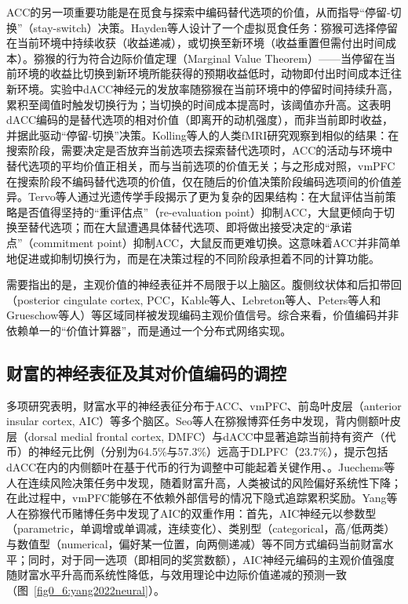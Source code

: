 ACC的另一项重要功能是在觅食与探索中编码替代选项的价值，从而指导“停留-切换”（stay-switch）决策。Hayden等人设计了一个虚拟觅食任务：猕猴可选择停留在当前环境中持续收获（收益递减），或切换至新环境（收益重置但需付出时间成本）。猕猴的行为符合边际价值定理（Marginal Value Theorem）——当停留在当前环境的收益比切换到新环境所能获得的预期收益低时，动物即付出时间成本迁往新环境。实验中dACC神经元的发放率随猕猴在当前环境中的停留时间持续升高，累积至阈值时触发切换行为；当切换的时间成本提高时，该阈值亦升高\cite{hayden2011neuronal}。这表明dACC编码的是替代选项的相对价值（即离开的动机强度），而非当前即时收益，并据此驱动“停留-切换”决策。Kolling等人的人类fMRI研究观察到相似的结果：在搜索阶段，需要决定是否放弃当前选项去探索替代选项时，ACC的活动与环境中替代选项的平均价值正相关，而与当前选项的价值无关；与之形成对照，vmPFC在搜索阶段不编码替代选项的价值，仅在随后的价值决策阶段编码选项间的价值差异\cite{kolling2012neural}。Tervo等人通过光遗传学手段揭示了更为复杂的因果结构：在大鼠评估当前策略是否值得坚持的“重评估点”（re-evaluation point）抑制ACC，大鼠更倾向于切换至替代选项；而在大鼠遭遇具体替代选项、即将做出接受决定的“承诺点”（commitment point）抑制ACC，大鼠反而更难切换\cite{tervo2021anterior}。这意味着ACC并非简单地促进或抑制切换行为，而是在决策过程的不同阶段承担着不同的计算功能。

需要指出的是，主观价值的神经表征并不局限于以上脑区。腹侧纹状体\cite{kable2007neural, lebreton2009automatic, demartino2009neurobiology, peters2009overlapping, prevost2010separate, bartra2013valuation}和后扣带回（posterior cingulate cortex, PCC，Kable等人、Lebreton等人、Peters等人和Grueschow等人\cite{kable2007neural, lebreton2009automatic, peters2009overlapping, grueschow2015automatic}）等区域同样被发现编码主观价值信号。综合来看，价值编码并非依赖单一的“价值计算器”，而是通过一个分布式网络实现。

\subsection{财富的神经表征及其对价值编码的调控}\label{chap1:wealth_neural}
多项研究表明，财富水平的神经表征分布于ACC、vmPFC、前岛叶皮层（anterior insular cortex, AIC）等多个脑区。Seo等人在猕猴博弈任务中发现，背内侧额叶皮层（dorsal medial frontal cortex, DMFC）与dACC中显著追踪当前持有资产（代币）的神经元比例（分别为64.5\%与57.3\%）远高于DLPFC（23.7\%），提示包括dACC在内的内侧额叶在基于代币的行为调整中可能起着关键作用、\cite{seo2009behavioral}。Juechems等人在连续风险决策任务中发现，随着财富升高，人类被试的风险偏好系统性下降；在此过程中，vmPFC能够在不依赖外部信号的情况下隐式追踪累积奖励\cite{juechems2017ventromedial}。Yang等人在猕猴代币赌博任务中发现了AIC的双重作用：首先，AIC神经元以参数型（parametric，单调增或单调减，连续变化）、类别型（categorical，高/低两类）与数值型（numerical，偏好某一位置，向两侧递减）等不同方式编码当前财富水平；同时，对于同一选项（即相同的奖赏数额），AIC神经元编码的主观价值强度随财富水平升高而系统性降低，与效用理论中边际价值递减的预测一致（图~\ref{fig0_6:yang2022neural}）\cite{yang2022primate}。


